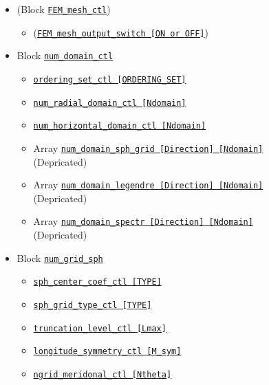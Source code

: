 		\begin{itemize}
		\item (Block \hyperref[href_t:FEM_mesh_ctl]{\tt FEM\_mesh\_ctl})
		\begin{itemize} \label{href_i:FEM_mesh_ctl}
		\item (\hyperref[href_t:FEM_mesh_output_switch]{\tt FEM\_mesh\_output\_switch [ON or OFF]})
		\end{itemize}
%
		\item Block \hyperref[href_t:num_domain_ctl]{\tt num\_domain\_ctl}
			\begin{itemize} \label{href_i:num_domain_ctl}
			\item \hyperref[href_t:ordering_set_ctl]{\tt ordering\_set\_ctl [ORDERING\_SET]}

			\item \hyperref[href_t:num_radial_domain_ctl]{\tt num\_radial\_domain\_ctl [Ndomain]}
			\item \hyperref[href_t:num_horizontal_domain_ctl]{\tt num\_horizontal\_domain\_ctl [Ndomain]}
%
            		\item {\color{magenta} Array \hyperref[href_t:num_domain_sph_grid]
				{\tt num\_domain\_sph\_grid    [Direction]    [Ndomain]} \\
				(Depricated)}
			\item {\color{magenta} Array \hyperref[href_t:num_domain_legendre]
				{\tt num\_domain\_legendre    [Direction]    [Ndomain]} \\
				(Depricated)}
			\item {\color{magenta} Array \hyperref[href_t:num_domain_spectr]
				{\tt num\_domain\_spectr      [Direction]    [Ndomain]} \\
				(Depricated)}
			\end{itemize}
%
		\item Block \hyperref[href_t:num_grid_sph]{\tt num\_grid\_sph}
			\begin{itemize} \label{href_i:num_grid_sph}
            \item \hyperref[href_t:sph_center_coef_ctl]{\tt sph\_center\_coef\_ctl   [TYPE]}
            \item \hyperref[href_t:sph_grid_type_ctl]{\tt   sph\_grid\_type\_ctl    [TYPE]}
	        \item \hyperref[href_t:truncation_level_ctl]{\tt truncation\_level\_ctl	[Lmax]}
            \item \hyperref[href_t:longitude_symmetry_ctl]{\tt longitude\_symmetry\_ctl    [M_sym]}
			\item \hyperref[href_t:ngrid_meridonal_ctl]{\tt ngrid\_meridonal\_ctl [Ntheta]}

\end{itemize}
\end{itemize}
